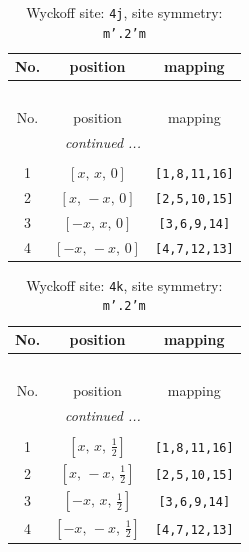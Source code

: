 \documentclass[fleqn,8pt]{jsarticle}
\begin{document}
\begin{longtable}{ccc}
\caption{Wyckoff site: {\tt 4j}, site symmetry: {\tt m'.2'm}}
 \\
 \hline \hline
No. & position & mapping \\ \hline \endfirsthead

\multicolumn{2}{l}{\tablename\ \thetable{}} \\
 \hline \hline
No. & position & mapping \\ \hline \endhead

 \hline \hline
\multicolumn{2}{r}{\footnotesize\it continued ...} \\ \endfoot

 \hline \hline
\multicolumn{2}{r}{} \\ \endlastfoot

1 & $\left[ x,\, x,\, 0 \right]$ & {\tt [1,8,11,16]} \\ \hline
2 & $\left[ x,\, - x,\, 0 \right]$ & {\tt [2,5,10,15]} \\ \hline
3 & $\left[ - x,\, x,\, 0 \right]$ & {\tt [3,6,9,14]} \\ \hline
4 & $\left[ - x,\, - x,\, 0 \right]$ & {\tt [4,7,12,13]} \\
\end{longtable}
\renewcommand{\arraystretch}{1.2}
\begin{longtable}{ccc}
\caption{Wyckoff site: {\tt 4k}, site symmetry: {\tt m'.2'm}}
 \\
 \hline \hline
No. & position & mapping \\ \hline \endfirsthead

\multicolumn{2}{l}{\tablename\ \thetable{}} \\
 \hline \hline
No. & position & mapping \\ \hline \endhead

 \hline \hline
\multicolumn{2}{r}{\footnotesize\it continued ...} \\ \endfoot

 \hline \hline
\multicolumn{2}{r}{} \\ \endlastfoot

1 & $\left[ x,\, x,\, \frac{1}{2} \right]$ & {\tt [1,8,11,16]} \\ \hline
2 & $\left[ x,\, - x,\, \frac{1}{2} \right]$ & {\tt [2,5,10,15]} \\ \hline
3 & $\left[ - x,\, x,\, \frac{1}{2} \right]$ & {\tt [3,6,9,14]} \\ \hline
4 & $\left[ - x,\, - x,\, \frac{1}{2} \right]$ & {\tt [4,7,12,13]} \\
\end{longtable}
\end{document}
